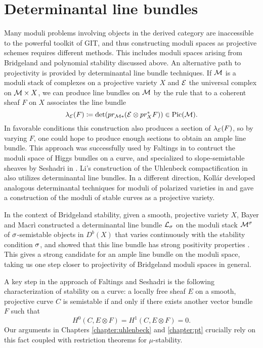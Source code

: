 \section{Determinantal line bundles}
Many moduli problems involving objects in the derived category are inaccessible to the powerful toolkit of GIT, and thus constructing moduli spaces as projective schemes requires different methods. This includes moduli spaces arising from Bridgeland and polynomial stability discussed above. An alternative path to projectivity is provided by determinantal line bundle techniques. If $\mathcal{M}$ is a moduli stack of complexes on a projective variety $X$ and $\mathcal{E}$ the universal complex on $\mathcal{M} \times X$, we can produce line bundles on $\mathcal{M}$ by the rule that to a coherent sheaf $F$ on $X$ associates the line bundle
\[ \lambda_{\mathcal{E}}(F) \coloneqq \det(pr_{\mathcal{M}*}(\mathcal{E} \otimes pr_X^* F)) \in \mathrm{Pic}(\mathcal{M}). \]
In favorable conditions this construction also produces a section of $\lambda_{\mathcal{E}}(F)$, so by varying $F$, one could hope to produce enough sections to obtain an ample line bundle. This approach was successfully used by Faltings in \cite{faltings} to contruct the moduli space of Higgs bundles on a curve, and specialized to slope-semistable sheaves by Seshadri in \cite{seshadri}. Li's construction of the Uhlenbeck compactification in \cite{li} also utilizes determinantal line bundles. In a different direction, Koll\'ar developed analogous determinantal techniques for moduli of polarized varieties in \cite{kollar-projectivity} and gave a construction of the moduli of stable curves as a projective variety.

In the context of Bridgeland stability, given a smooth, projective variety $X$, Bayer and Macr\`i constructed a determinantal line bundle $\mathcal{L}_\sigma$ on the moduli stack $\mathcal{M}^\sigma$ of $\sigma$-semistable objects in $D^b(X)$ that varies continuously with the stability condition $\sigma$, and showed that this line bundle has strong positivity properties \cite{BM}. This gives a strong candidate for an ample line bundle on the moduli space, taking us one step closer to projectivity of Bridgeland moduli spaces in general.

A key step in the approach of Faltings and Seshadri is the following characterization of stability on a curve: a locally free sheaf $E$ on a smooth, projective curve $C$ is semistable if and only if there exists another vector bundle $F$ such that 
\[ H^0(C, E \otimes F) = H^1(C, E \otimes F) = 0. \]
Our arguments in Chapters \ref{chapter:uhlenbeck} and \ref{chapter:pt} crucially rely on this fact coupled with restriction theorems for $\mu$-stability.

